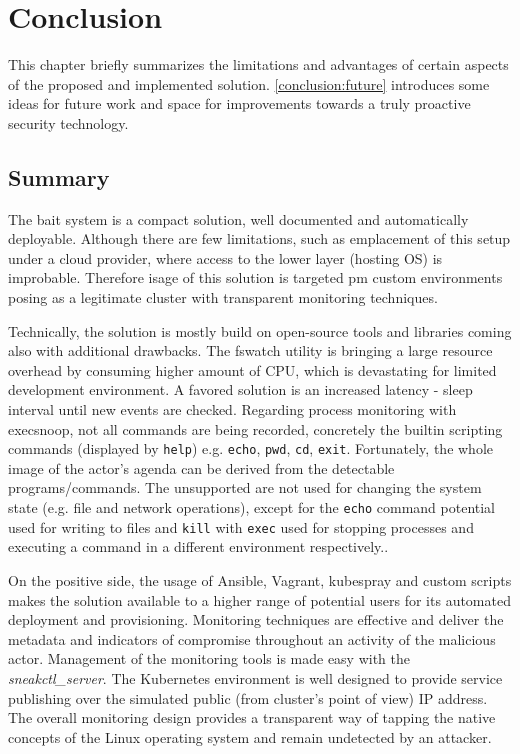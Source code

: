 \chapter{Conclusion \label{conclusion}}
This chapter briefly summarizes the limitations and advantages of certain aspects of the proposed and implemented solution. \autoref{conclusion:future} introduces some ideas for future work and space for improvements towards a truly proactive security technology. 

\section{Summary \label{conclusion:summary}}
The bait system is a compact solution, well documented and automatically deployable. Although there are few limitations, such as emplacement of this setup under a cloud provider, where access to the lower layer (hosting OS) is improbable. Therefore isage of this solution is targeted pm custom environments posing as a legitimate cluster with transparent monitoring techniques.

Technically, the solution is mostly build on open-source tools and libraries coming also with additional drawbacks. The fswatch utility is bringing a large resource overhead by consuming higher amount of CPU, which is devastating for limited development environment. A favored solution is an increased latency - sleep interval until new events are checked. Regarding process monitoring with execsnoop, not all commands are being recorded, concretely the builtin scripting commands (displayed by \texttt{help}) e.g. \texttt{echo}, \texttt{pwd}, \texttt{cd}, \texttt{exit}. Fortunately, the whole image of the actor's agenda can be derived from the detectable programs/commands. The unsupported are not used for changing the system state (e.g. file and network operations), except for the \texttt{echo} command potential used for writing to files and \texttt{kill} with \texttt{exec} used for stopping processes and executing a command in a different environment respectively..

On the positive side, the usage of Ansible, Vagrant, kubespray and custom scripts makes the solution available to a higher range of potential users for its automated deployment and provisioning. Monitoring techniques are effective and deliver the metadata and indicators of compromise throughout an activity of the malicious actor. Management of the monitoring tools is made easy with the \textit{sneakctl\_server}. The Kubernetes environment is well designed to provide service publishing over the simulated public (from cluster's point of view) IP address. The overall monitoring design provides a transparent way of tapping the native concepts of the Linux operating system and remain undetected by an attacker.

